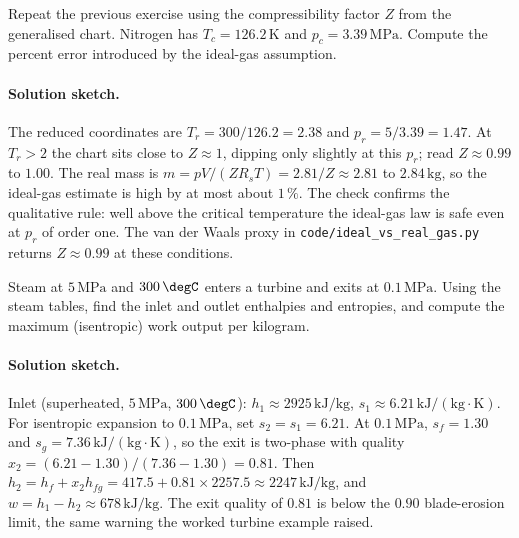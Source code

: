 \begin{exercise}
Repeat the previous exercise using the compressibility factor $Z$
from the generalised chart. Nitrogen has $T_c = 126.2\,\si{\kelvin}$
and $p_c = 3.39\,\text{MPa}$. Compute the percent error introduced by
the ideal-gas assumption.

\paragraph{Solution sketch.} The reduced coordinates are $T_r =
300/126.2 = 2.38$ and $p_r = 5/3.39 = 1.47$. At $T_r > 2$ the chart sits
close to $Z \approx 1$, dipping only slightly at this $p_r$; read
$Z \approx 0.99$ to $1.00$. The real mass is $m = pV/(Z R_s T) =
2.81/Z \approx 2.81$ to $2.84\,\text{kg}$, so the ideal-gas estimate is
high by at most about $1\,\%$. The check confirms the qualitative rule:
well above the critical temperature the ideal-gas law is safe even at
$p_r$ of order one. The van der Waals proxy in
\texttt{code/ideal\_vs\_real\_gas.py} returns $Z \approx 0.99$ at these
conditions.
\end{exercise}

\begin{exercise}
Steam at $5\,\text{MPa}$ and $300\,\degC$ enters a turbine and exits
at $0.1\,\text{MPa}$. Using the steam tables, find the inlet and
outlet enthalpies and entropies, and compute the maximum (isentropic)
work output per kilogram.

\paragraph{Solution sketch.} Inlet (superheated, $5\,\text{MPa}$,
$300\,\degC$): $h_1 \approx 2925\,\text{kJ}/\text{kg}$, $s_1 \approx 6.21
\,\text{kJ}/(\text{kg}\cdot\si{\kelvin})$. For isentropic expansion to
$0.1\,\text{MPa}$, set $s_2 = s_1 = 6.21$. At $0.1\,\text{MPa}$,
$s_f = 1.30$ and $s_g = 7.36\,\text{kJ}/(\text{kg}\cdot\si{\kelvin})$, so
the exit is two-phase with quality $x_2 = (6.21 - 1.30)/(7.36 - 1.30) =
0.81$. Then $h_2 = h_f + x_2 h_{fg} = 417.5 + 0.81\times 2257.5 \approx
2247\,\text{kJ}/\text{kg}$, and $w = h_1 - h_2 \approx 678\,\text{kJ}/
\text{kg}$. The exit quality of $0.81$ is below the $0.90$ blade-erosion
limit, the same warning the worked turbine example raised.
\end{exercise}


